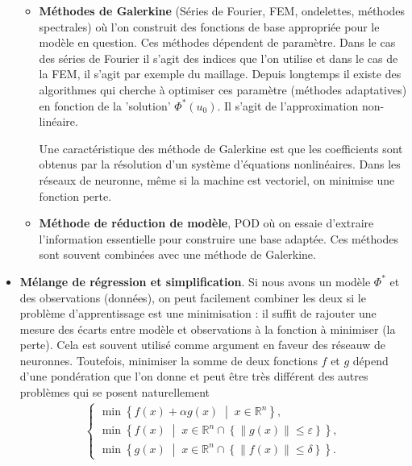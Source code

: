 \documentclass[11pt,a4paper]{article}
\newcommand{\R}{\mathbb R}
\newcommand{\eps}{\varepsilon}
\newcommand{\norm}[1]{\|#1\|}
\newcommand{\Set}[1]{\left\{#1\right\}}
\newcommand{\SetDef}[2]{\left\{#1\;\middle|\;#2\right\}}
\begin{document}
\begin{itemize}
\begin{itemize}
%
\item \textbf{Méthodes de Galerkine} (Séries de Fourier, FEM, ondelettes, méthodes spectrales) où l'on construit des fonctions de base appropriée pour le modèle en question. Ces méthodes dépendent de paramètre. Dans le cas des séries de Fourier il s'agit des indices que l'on utilise et dans le cas de la FEM, il s'agit par exemple du maillage. Depuis longtemps il existe des algorithmes qui cherche à optimiser ces paramètre (méthodes adaptatives) en fonction de la 'solution' $\Phi^*(u_0)$. Il s'agit de l'approximation non-linéaire. 

Une caractéristique des méthode de Galerkine est que les coefficients sont obtenus par la résolution d'un système d'équations nonlinéaires.
Dans les réseaux de neuronne, même si la machine est vectoriel, on minimise une fonction perte.  
%
\item \textbf{Méthode de réduction de modèle}, POD où on essaie d'extraire l'information essentielle pour construire une base adaptée. Ces méthodes sont souvent combinées avec une méthode de Galerkine.
\end{itemize}
%
\item \textbf{Mélange de régression et simplification}. Si nous avons un modèle $\Phi^*$ et des observations (données), on peut facilement combiner les deux si le problème d'apprentissage est une minimisation : il suffit de rajouter une mesure des écarts entre modèle et observations à la fonction à minimiser (la perte). Cela est souvent utilisé comme argument en faveur des réseauw de neuronnes. 
Toutefois, minimiser la somme de deux fonctions $f$ et $g$ dépend d'une pondération que l'on donne et peut être très différent des autres problèmes qui se posent naturellement
\begin{align*}
\left\{
\begin{aligned}
\min\SetDef{f(x)+\alpha g(x)}{x\in\R^n},\\ 
\min\SetDef{f(x)}{x\in\R^n\cap\Set{\norm{g(x)}\le \eps}},\\
\min\SetDef{g(x)}{x\in\R^n\cap\Set{\norm{f(x)}\le \delta}}.
\end{aligned}
\right.
\end{align*}
\end{itemize}
%
\end{document}
